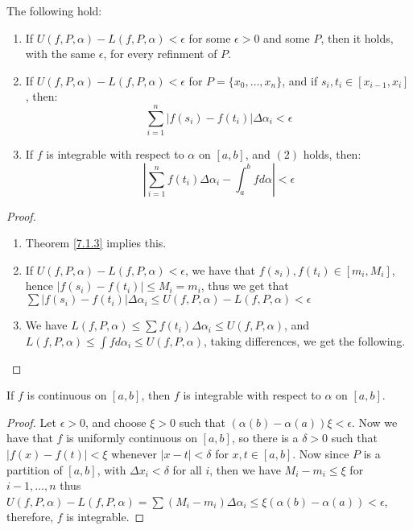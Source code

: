 \begin{theorem}\label{7.1.6}
    The following hold:
        \begin{enumerate}[label=(\arabic*)]
            \item If $U(f,P,\alpha)-L(f,P,\alpha)<\epsilon$ for some
                $\epsilon>0$ and some $P$, then it holds, with the same
                $\epsilon$, for every refinment of  $P$.

            \item If $U(f,P,\alpha)-L(f,P,\alpha)<\epsilon$ for $P=\{x_0, \dots,
                x_n\}$, and if $s_i,t_i \in [x_{i-1},x_i]$, then:
                   \begin{equation}
                       \sum_{i=1}^{n}{|f(s_i)-f(t_i)|\Delta\alpha_i}<\epsilon
                   \end{equation}  

               \item If $f$ is integrable with respect to  $\alpha$ on  $[a,b]$,
                   and  $(2)$ holds, then: 
                   \begin{equation}
                       |\sum_{i=1}^{n}{f(t_i)\Delta{\alpha_i}}-\int_{a}^{b}{f}d\alpha|<\epsilon		
                   \end{equation} 
        \end{enumerate}
\end{theorem}
\begin{proof}
    \begin{enumerate}[label=(\arabic*)]
        \item Theorem \ref{7.1.3} implies this.

        \item If $U(f,P,\alpha)-L(f,P,\alpha)<\epsilon$, we have that
            $f(s_i),f(t_i) \in [m_i,M_i]$, hence $|f(s_i)-f(t_i)| \leq M_i=m_i$,
            thus we get that  $\sum{|f(s_i)-f(t_i)|\Delta{\alpha_i}} \leq U(f,P,\alpha)-L(f,P,\alpha)<\epsilon$

        \item We have $L(f,P,\alpha) \leq \sum{f(t_i)\Delta{\alpha_i}} \leq
    U(f,P,\alpha)$, and  $L(f,P,\alpha) \leq \int{f}d\alpha_i \leq
            U(f,P,\alpha)$, taking differences, we get the following.
    \end{enumerate}		
\end{proof}

\begin{theorem}\label{7.1.7}
    If $f$ is continuous on  $[a,b]$, then  $f$ is integrable with respect to
    $\alpha$ on  $[a,b]$.
\end{theorem}
\begin{proof}
    Let $\epsilon>0$, and choose  $\xi>0$ such that
    $(\alpha(b)-\alpha(a))\xi<\epsilon$. Now we have that  $f$ is uniformly
    continuous on  $[a,b]$, so there is a  $\delta>0$ such that
    $|f(x)-f(t)|<\xi$ whenever $|x-t|<\delta$ for $x,t \in [a,b]$. Now since $P$
    is a partition of  $[a,b]$, with  $\Delta{x_i}<\delta$ for all  $i$, then we
    have $M_i-m_i \leq \xi$ for  $i-1, \dots, n$ thus
    $U(f,P,\alpha)-L(f,P,\alpha)=\sum{(M_i-m_i)\Delta{\alpha_i}} \leq
    \xi(\alpha(b)-\alpha(a))<\epsilon$, therefore,  $f$ is integrable.
\end{proof}

